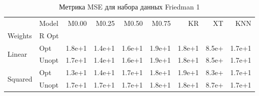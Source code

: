 \begin{table}
\caption{Метрика MSE для набора данных Friedman 1}
\label{tab:MSE_Friedman 1}
\begin{tabular}{llrrrrrrr}
\toprule
 & Model & M0.00 & M0.25 & M0.50 & M0.75 & KR & XT & KNN \\
Weights & R Opt &  &  &  &  &  &  &  \\
\midrule
\multirow[t]{2}{*}{Linear} & Opt & 1.8e+1 & 1.4e+1 & 1.6e+1 & 1.9e+1 & 1.8e+1 & 8.5e+ & 1.7e+1 \\
 & Unopt & 1.7e+1 & 1.4e+1 & 1.6e+1 & 1.9e+1 & 1.8e+1 & 8.5e+ & 1.7e+1 \\

\multirow[t]{2}{*}{Squared} & Opt & 1.3e+1 & 1.4e+1 & 1.7e+1 & 1.8e+1 & 1.9e+1 & 8.3e+ & 1.7e+1 \\
 & Unopt & 1.7e+1 & 1.7e+1 & 1.7e+1 & 1.8e+1 & 1.8e+1 & 8.7e+ & 1.7e+1 \\

\bottomrule
\end{tabular}
\end{table}
